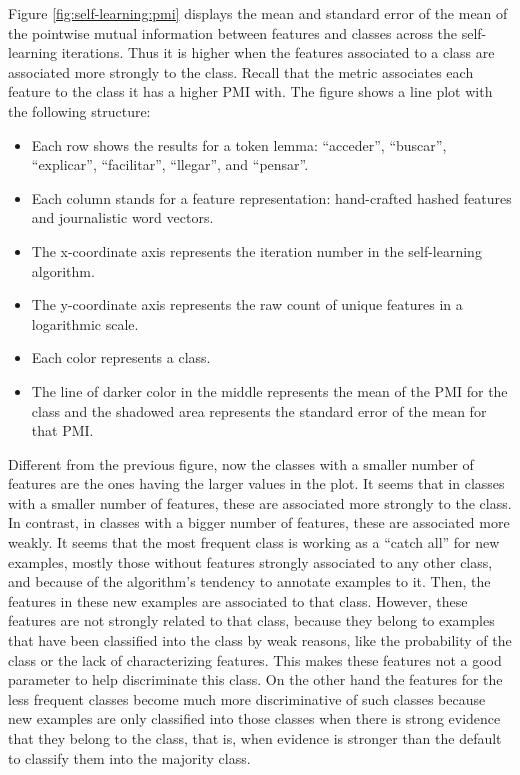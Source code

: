 Figure \ref{fig:self-learning:pmi} displays the mean and standard error of the
mean of the pointwise mutual information between features and classes across
the self-learning iterations. Thus it is higher when the features associated to
a class are associated more strongly to the class. Recall that the metric
associates each feature to the class it has a higher PMI with. The figure shows
a line plot with the following structure:

\begin{itemize}
  \item Each row shows the results for a token lemma: ``acceder'', ``buscar'',
    ``explicar'', ``facilitar'', ``llegar'', and ``pensar''.
  \item Each column stands for a feature representation: hand-crafted hashed
    features and journalistic word vectors.
  \item The x-coordinate axis represents the iteration number in the
    self-learning algorithm.
  \item The y-coordinate axis represents the raw count of unique features in a
    logarithmic scale.
  \item Each color represents a class.
  \item The line of darker color in the middle represents the mean of the PMI
    for the class and the shadowed area represents the standard error of the
    mean for that PMI.
\end{itemize}

Different from the previous figure, now the classes with a smaller number of
features are the ones having the larger values in the plot. It seems that in
classes with a smaller number of features, these are associated more strongly
to the class. In contrast, in classes with a bigger number of features, these
are associated more weakly. It seems that the most frequent class is working as
a ``catch all'' for new examples, mostly those without features strongly
associated to any other class, and because of the algorithm's tendency to
annotate examples to it. Then, the features in these new examples are
associated to that class. However, these features are not strongly related to
that class, because they belong to examples that have been classified into the
class by weak reasons, like the probability of the class or the lack of
characterizing features. This makes these features not a good parameter to help
discriminate this class. On the other hand the features for the less frequent
classes become much more discriminative of such classes because new examples
are only classified into those classes when there is strong evidence that they
belong to the class, that is, when evidence is stronger than the default to
classify them into the majority class.

